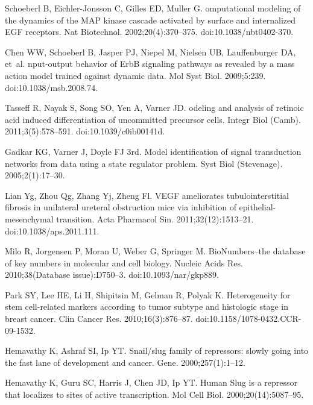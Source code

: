 \documentclass[11pt,letterpaper]{article}
\begin{document}
\begin{thebibliography}{10}
Schoeberl B, Eichler-Jonsson C, Gilles ED, Muller G.
omputational modeling of the dynamics of the {MAP} kinase cascade
  activated by surface and internalized {EGF} receptors.
\newblock Nat Biotechnol. 2002;20(4):370--375.
\newblock doi:{10.1038/nbt0402-370}.

Chen WW, Schoeberl B, Jasper PJ, Niepel M, Nielsen UB, Lauffenburger DA, et~al.
nput-output behavior of {E}rb{B} signaling pathways as revealed by
  a mass action model trained against dynamic data.
\newblock Mol Syst Biol. 2009;5:239.
\newblock doi:{10.1038/msb.2008.74}.

Tasseff R, Nayak S, Song SO, Yen A, Varner JD.
odeling and analysis of retinoic acid induced differentiation of
  uncommitted precursor cells.
\newblock Integr Biol (Camb). 2011;3(5):578--591.
\newblock doi:{10.1039/c0ib00141d}.

Gadkar KG, Varner J, Doyle FJ 3rd.
\newblock Model identification of signal transduction networks from data using
  a state regulator problem.
\newblock Syst Biol (Stevenage). 2005;2(1):17--30.

Lian Yg, Zhou Qg, Zhang Yj, Zheng Fl.
\newblock VEGF ameliorates tubulointerstitial fibrosis in unilateral ureteral
  obstruction mice via inhibition of epithelial-mesenchymal transition.
\newblock Acta Pharmacol Sin. 2011;32(12):1513--21.
\newblock doi:{10.1038/aps.2011.111}.

Milo R, Jorgensen P, Moran U, Weber G, Springer M.
\newblock BioNumbers--the database of key numbers in molecular and cell
  biology.
\newblock Nucleic Acids Res. 2010;38(Database issue):D750--3.
\newblock doi:{10.1093/nar/gkp889}.

Park SY, Lee HE, Li H, Shipitsin M, Gelman R, Polyak K.
\newblock Heterogeneity for stem cell-related markers according to tumor
  subtype and histologic stage in breast cancer.
\newblock Clin Cancer Res. 2010;16(3):876--87.
\newblock doi:{10.1158/1078-0432.CCR-09-1532}.

Hemavathy K, Ashraf SI, Ip YT.
\newblock Snail/slug family of repressors: slowly going into the fast lane of
  development and cancer.
\newblock Gene. 2000;257(1):1--12.

Hemavathy K, Guru SC, Harris J, Chen JD, Ip YT.
\newblock Human Slug is a repressor that localizes to sites of active
  transcription.
\newblock Mol Cell Biol. 2000;20(14):5087--95.


\end{thebibliography}
\end{document}
